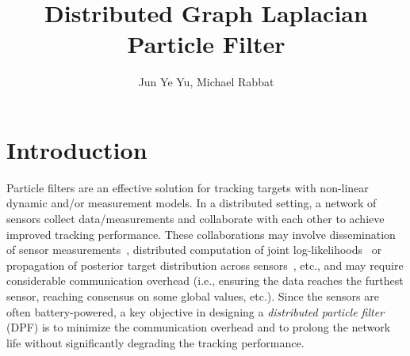 \documentclass[10pt,letterpaper,final]{article}
\title{Distributed Graph Laplacian Particle Filter}
\author{Jun Ye Yu, Michael Rabbat}
\begin{document}
\maketitle


\section{Introduction}
Particle filters are an effective solution for tracking targets with non-linear dynamic and/or measurement models. In a distributed setting, a network of sensors collect data/measurements and collaborate with each other to achieve improved tracking performance. These collaborations may involve dissemination of sensor measurements~\cite{Rosencrantz2003, Coates2004}, distributed computation of joint log-likelihoods~\cite{Hlinka2012, Mohammadi2014, Rabbat2016, Yu2016} or propagation of posterior target distribution across sensors~\cite{Yan2006}, etc., and may require considerable communication overhead (i.e., ensuring the data reaches the furthest sensor, reaching consensus on some global values, etc.). Since the sensors are often battery-powered, a key objective in designing a \textit{distributed particle filter} (DPF) is to minimize the communication overhead and to prolong the network life without significantly degrading the tracking performance. 
\end{document}
